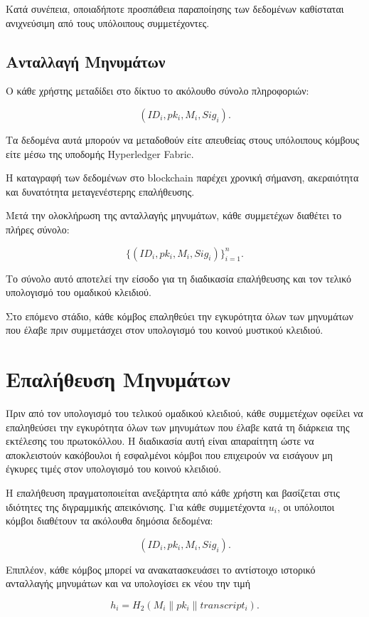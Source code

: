 \documentclass[12pt,a4paper]{report}
\begin{document}
Κατά συνέπεια, οποιαδήποτε προσπάθεια παραποίησης των δεδομένων καθίσταται ανιχνεύσιμη από τους υπόλοιπους συμμετέχοντες.

\subsection{Ανταλλαγή Μηνυμάτων}

Ο κάθε χρήστης μεταδίδει στο δίκτυο το ακόλουθο σύνολο πληροφοριών:

\[
\left(
ID_i,
pk_i,
M_i,
Sig_i
\right).
\]

Τα δεδομένα αυτά μπορούν να μεταδοθούν είτε απευθείας στους υπόλοιπους κόμβους είτε μέσω της υποδομής Hyperledger Fabric.

Η καταγραφή των δεδομένων στο blockchain παρέχει χρονική σήμανση, ακεραιότητα και δυνατότητα μεταγενέστερης επαλήθευσης.

Μετά την ολοκλήρωση της ανταλλαγής μηνυμάτων, κάθε συμμετέχων διαθέτει το πλήρες σύνολο:

\[
\{
(ID_i,pk_i,M_i,Sig_i)
\}_{i=1}^{n}.
\]

Το σύνολο αυτό αποτελεί την είσοδο για τη διαδικασία επαλήθευσης και τον τελικό υπολογισμό του ομαδικού κλειδιού.

Στο επόμενο στάδιο, κάθε κόμβος επαληθεύει την εγκυρότητα όλων των μηνυμάτων που έλαβε πριν συμμετάσχει στον υπολογισμό του κοινού μυστικού κλειδιού.

\section{Επαλήθευση Μηνυμάτων}

Πριν από τον υπολογισμό του τελικού ομαδικού κλειδιού, κάθε συμμετέχων οφείλει να επαληθεύσει την εγκυρότητα όλων των μηνυμάτων που έλαβε κατά τη διάρκεια της εκτέλεσης του πρωτοκόλλου. Η διαδικασία αυτή είναι απαραίτητη ώστε να αποκλειστούν κακόβουλοι ή εσφαλμένοι κόμβοι που επιχειρούν να εισάγουν μη έγκυρες τιμές στον υπολογισμό του κοινού κλειδιού.

Η επαλήθευση πραγματοποιείται ανεξάρτητα από κάθε χρήστη και βασίζεται στις ιδιότητες της διγραμμικής απεικόνισης. Για κάθε συμμετέχοντα $u_i$, οι υπόλοιποι κόμβοι διαθέτουν τα ακόλουθα δημόσια δεδομένα:

\[
(ID_i, pk_i, M_i, Sig_i).
\]

Επιπλέον, κάθε κόμβος μπορεί να ανακατασκευάσει το αντίστοιχο ιστορικό ανταλλαγής μηνυμάτων και να υπολογίσει εκ νέου την τιμή

\[
h_i =
H_2
\left(
M_i
\parallel
pk_i
\parallel
transcript_i
\right).
\]
\end{document}
